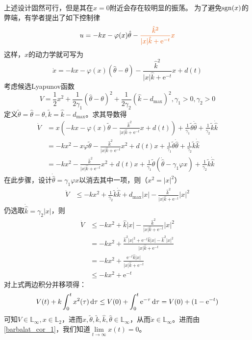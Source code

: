 上述设计固然可行，但是其在$x=0$附近会存在较明显的振荡。
为了避免$\operatorname{sgn}(x)$的弊端，有学者提出了如下控制律
\[u=-kx-\varphi(x)\hat{\theta}-\textcolor{second}{\frac{\hat{k}^2}{|x|\hat{k}+\mathrm{e}^{-t}}x}\]
这样，$x$的动力学就可写为
\[\dot{x}=-kx-\varphi(x)(\hat{\theta}-\theta)-\frac{\hat{k}^2}{|x|\hat{k}+\mathrm{e}^{-t}}x+d(t)\]
考虑候选Lyapunov函数
\[V=\frac{1}{2}x^2+\frac{1}{2\gamma_1}(\hat{\theta}-\theta)^2+\frac{1}{2\gamma_2}(\hat{k}-d_{\max})^2,\gamma_1>0,\gamma_2>0\]
定义$\tilde{\theta}=\hat{\theta}-\theta,\tilde{k}=\hat{k}-d_{\max}$。求其导数得
\begin{align*}
    \dot{V}&=x\left(-kx-\varphi(x)\tilde{\theta}-\frac{\hat{k}^2}{|x|\hat{k}+\mathrm{e}^{-t}}x+d(t)\right)+\frac{1}{\gamma_1}\tilde{\theta}\dot{\hat{\theta}}+\frac{1}{\gamma_2}\tilde{k}\dot{\hat{k}}\\
    &=-kx^2-x\varphi\tilde{\theta}-\frac{\hat{k}^2}{|x|\hat{k}+\mathrm{e}^{-t}}x^2+d(t)x+\frac{1}{\gamma_1}\tilde{\theta}\dot{\hat{\theta}}+\frac{1}{\gamma_2}\tilde{k}\dot{\hat{k}}\\
    &=-kx^2-\frac{\hat{k}^2}{|x|\hat{k}+\mathrm{e}^{-t}}x^2+d(t)x+\frac{1}{\gamma_1}\tilde{\theta}(\dot{\hat{\theta}}-\gamma_1\varphi x)+\frac{1}{\gamma_2}\tilde{k}\dot{\hat{k}}
\end{align*}
在此步骤，设计$\dot{\hat{\theta}}=\gamma_1\varphi x$以消去其中一项，则（$x^2=|x|^2$）
\begin{align*}
    \dot{V}&\leq -kx^2+\frac{1}{\gamma_2}\tilde{k}\dot{\hat{k}}+d_{\max}|x|-\frac{\hat{k}^2}{|x|\hat{k}+\mathrm{e}^{-t}}|x|^2
\end{align*}
仍选取$\dot{\hat{k}}=\gamma_2 |x|$，则
\begin{align*}
   \dot{V} &\leq-kx^2+{\hat{k}}|x|-\frac{\hat{k}^2}{|x|\hat{k}+\mathrm{e}^{-t}}|x|^2\\
    &=-kx^2+\frac{\hat{k}^2|x|^2+\mathrm{e}^{-t}\hat{k}|x|-\hat{k}^2|x|^2}{|x|\hat{k}+\mathrm{e}^{-t}}\\
    &=-kx^2+\frac{\mathrm{e}^{-t}\hat{k}|x|}{|x|\hat{k}+\mathrm{e}^{-t}}\\
    &\leq -kx^2+\mathrm{e}^{-t}
\end{align*}
对上式两边积分并移项得：
\[V(t)+k\int_{0}^{t} x^2(\tau)\mathop{}\!\mathrm{d}\tau\le V(0)+\int_{0}^{t} \mathrm{e}^{-\tau}\mathop{}\!\mathrm{d}\tau=V(0)+(1-\mathrm{e}^{-t})\]
可知$V\in\mathbb{L}_\infty,x\in\mathbb{L}_2$，进而$x,\tilde{\theta},\tilde{k},\hat{k},\hat{\theta}\in\mathbb{L}_\infty$，从而$\dot{x}\in\mathbb{L}_\infty$。进而由 \ref{barbalat_cor_1}，我们知道$\lim\limits_{t\to\infty}x(t)=0$。